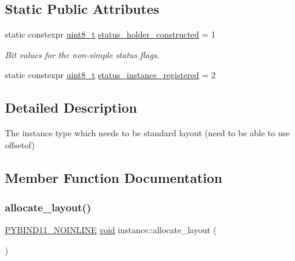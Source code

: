 \subsection*{Static Public Attributes}
\begin{DoxyCompactItemize}
\item 
static constexpr \mbox{\hyperlink{_s_d_l__config_8h_aba7bc1797add20fe3efdf37ced1182c5}{uint8\+\_\+t}} \mbox{\hyperlink{structinstance_a2d8ccf4b4d7dcb8083cee8cc030ec871}{status\+\_\+holder\+\_\+constructed}} = 1
\begin{DoxyCompactList}\small\item\em Bit values for the non-\/simple status flags. \end{DoxyCompactList}\item 
static constexpr \mbox{\hyperlink{_s_d_l__config_8h_aba7bc1797add20fe3efdf37ced1182c5}{uint8\+\_\+t}} \mbox{\hyperlink{structinstance_a48612cbb682f9b16cbaeba60f1bca052}{status\+\_\+instance\+\_\+registered}} = 2
\end{DoxyCompactItemize}


\subsection{Detailed Description}
The \textquotesingle{}instance\textquotesingle{} type which needs to be standard layout (need to be able to use \textquotesingle{}offsetof\textquotesingle{}) 

\subsection{Member Function Documentation}
\mbox{\label{structinstance_addb02b48487bafc757c28d40d1d6a995}} 
\subsubsection{\texorpdfstring{allocate\_layout()}{allocate\_layout()}}
{\footnotesize\ttfamily \mbox{\hyperlink{detail_2common_8h_a1fb186b7494d5c576d902c0730ecbb71}{P\+Y\+B\+I\+N\+D11\+\_\+\+N\+O\+I\+N\+L\+I\+NE}} \mbox{\hyperlink{_s_d_l__opengles2__gl2ext_8h_ae5d8fa23ad07c48bb609509eae494c95}{void}} instance\+::allocate\+\_\+layout (\begin{DoxyParamCaption}{ }\end{DoxyParamCaption})\hspace{0.3cm}{\ttfamily [inline]}}



